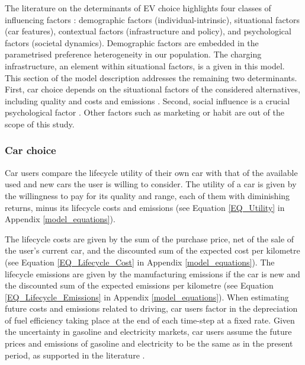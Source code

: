 \documentclass[12pt]{article}
\begin{document}
    The literature on the determinants of EV choice highlights four classes of influencing factors \citep{singh_review_2020,pandita2024electrifying}: demographic factors (individual-intrinsic), situational factors (car features), contextual factors (infrastructure and policy), and psychological factors (societal dynamics). Demographic factors are embedded in the parametrised preference heterogeneity in our population. The charging infrastructure, an element within situational factors, is a given in this model. This section of the model description addresses the remaining two determinants. First, car choice depends on the situational factors of the considered alternatives, including quality and costs \citep{neves_technological_2019,hulshof2020willingness,pandita2024electrifying} and emissions \citep{hidrue2011willingness, biresselioglu_electric_2018,chen_assessing_2019}. Second, social influence is a crucial psychological factor \citep{sovacool2017experts,peng2024identifying}. Other factors such as marketing or habit \citep{singh_review_2020} are out of the scope of this study.
	
	\subsubsection{Car choice} \label{Users_Choice}
    
    Car users compare the lifecycle utility of their own car with that of the available used and new cars the user is willing to consider. The utility of a car is given by the willingness to pay for its quality and range, each of them with diminishing returns, minus its lifecycle costs and emissions \citep[p.4]{ipcc2022transport} (see Equation \ref{EQ_Utility} in Appendix \ref{model_equations}).    

    The lifecycle costs are given by the sum of the purchase price, net of the sale of the user's current car, and the discounted sum of the expected cost per kilometre (see Equation \ref{EQ_Lifecycle_Cost} in Appendix \ref{model_equations}). The lifecycle emissions are given by the manufacturing emissions if the car is new and the discounted sum of the expected emissions per kilometre (see Equation \ref{EQ_Lifecycle_Emissions} in Appendix \ref{model_equations}). When estimating future costs and emissions related to driving, car users factor in the depreciation of fuel efficiency taking place at the end of each time-step at a fixed rate. Given the uncertainty in gasoline and electricity markets, car users assume the future prices and emissions of gasoline and electricity to be the same as in the present period, as supported in the literature \citep{Anderson2013}.
	
\end{document}
